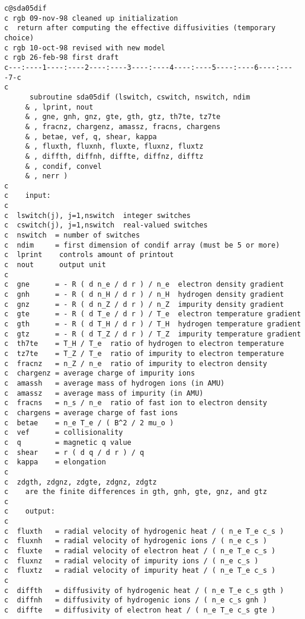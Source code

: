 \begin{verbatim}
c@sda05dif
c rgb 09-nov-98 cleaned up initialization
c  return after computing the effective diffusivities (temporary choice)
c rgb 10-oct-98 revised with new model
c rgb 26-feb-98 first draft
c---:----1----:----2----:----3----:----4----:----5----:----6----:----7-c
c
      subroutine sda05dif (lswitch, cswitch, nswitch, ndim
     & , lprint, nout
     & , gne, gnh, gnz, gte, gth, gtz, th7te, tz7te
     & , fracnz, chargenz, amassz, fracns, chargens
     & , betae, vef, q, shear, kappa
     & , fluxth, fluxnh, fluxte, fluxnz, fluxtz
     & , diffth, diffnh, diffte, diffnz, difftz
     & , condif, convel
     & , nerr )
c
c    input:
c
c  lswitch(j), j=1,nswitch  integer switches
c  cswitch(j), j=1,nswitch  real-valued switches
c  nswitch  = number of switches
c  ndim     = first dimension of condif array (must be 5 or more)
c  lprint    controls amount of printout
c  nout      output unit
c
c  gne      = - R ( d n_e / d r ) / n_e  electron density gradient
c  gnh      = - R ( d n_H / d r ) / n_H  hydrogen density gradient
c  gnz      = - R ( d n_Z / d r ) / n_Z  impurity density gradient
c  gte      = - R ( d T_e / d r ) / T_e  electron temperature gradient
c  gth      = - R ( d T_H / d r ) / T_H  hydrogen temperature gradient
c  gtz      = - R ( d T_Z / d r ) / T_Z  impurity temperature gradient
c  th7te    = T_H / T_e  ratio of hydrogen to electron temperature
c  tz7te    = T_Z / T_e  ratio of impurity to electron temperature
c  fracnz   = n_Z / n_e  ratio of impurity to electron density
c  chargenz = average charge of impurity ions
c  amassh   = average mass of hydrogen ions (in AMU)
c  amassz   = average mass of impurity (in AMU)
c  fracns   = n_s / n_e  ratio of fast ion to electron density
c  chargens = average charge of fast ions
c  betae    = n_e T_e / ( B^2 / 2 mu_o )
c  vef      = collisionality
c  q        = magnetic q value
c  shear    = r ( d q / d r ) / q
c  kappa    = elongation
c
c  zdgth, zdgnz, zdgte, zdgnz, zdgtz
c    are the finite differences in gth, gnh, gte, gnz, and gtz
c
c    output:
c
c  fluxth   = radial velocity of hydrogenic heat / ( n_e T_e c_s )
c  fluxnh   = radial velocity of hydrogenic ions / ( n_e c_s )
c  fluxte   = radial velocity of electron heat / ( n_e T_e c_s )
c  fluxnz   = radial velocity of impurity ions / ( n_e c_s )
c  fluxtz   = radial velocity of impurity heat / ( n_e T_e c_s )
c
c  diffth   = diffusivity of hydrogenic heat / ( n_e T_e c_s gth )
c  diffnh   = diffusivity of hydrogenic ions / ( n_e c_s gnh )
c  diffte   = diffusivity of electron heat / ( n_e T_e c_s gte )

\end{verbatim}

